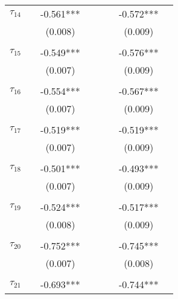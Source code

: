 \begin{tabular}{@{\extracolsep{-2pt}}lccccccc}
$\tau_{14}$ &      & -0.561*** &          &&      & -0.572*** &            \\
            &      &  (0.008)  &          &&      &  (0.009)  &            \\
            &      &           &          &&      &           &            \\[-2.1ex]
$\tau_{15}$ &      & -0.549*** &          &&      & -0.576*** &            \\
            &      &  (0.007)  &          &&      &  (0.009)  &            \\
            &      &           &          &&      &           &            \\[-2.1ex]
$\tau_{16}$ &      & -0.554*** &          &&      & -0.567*** &            \\
            &      &  (0.007)  &          &&      &  (0.009)  &            \\
            &      &           &          &&      &           &            \\[-2.1ex]
$\tau_{17}$ &      & -0.519*** &          &&      & -0.519*** &            \\
            &      &  (0.007)  &          &&      &  (0.009)  &            \\
            &      &           &          &&      &           &            \\[-2.1ex]
$\tau_{18}$ &      & -0.501*** &          &&      & -0.493*** &            \\
            &      &  (0.007)  &          &&      &  (0.009)  &            \\
            &      &           &          &&      &           &            \\[-2.1ex]
$\tau_{19}$ &      & -0.524*** &          &&      & -0.517*** &            \\
            &      &  (0.008)  &          &&      &  (0.009)  &            \\
            &      &           &          &&      &           &            \\[-2.1ex]
$\tau_{20}$ &      & -0.752*** &          &&      & -0.745*** &            \\
            &      &  (0.007)  &          &&      &  (0.008)  &            \\
            &      &           &          &&      &           &            \\[-2.1ex]
$\tau_{21}$ &      & -0.693*** &          &&      & -0.744*** &            \\

\end{tabular}
